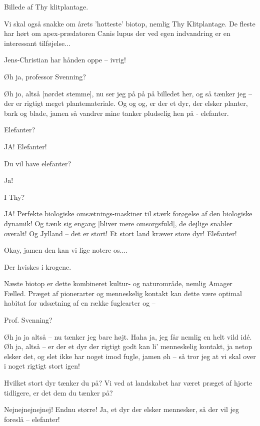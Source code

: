 \documentclass[a4paper,12pt]{article}
\begin{document}
\begin{sketch}
 Billede af Thy klitplantage.

 Vi skal også snakke om årets 'hotteste' biotop, nemlig Thy Klitplantage. De fleste har hørt om apex-prædatoren Canis lupus der ved egen indvandring er en interessant tilføjelse...

Jens-Christian har hånden oppe -- ivrig!

 Øh ja, professor Svenning?

 Øh jo, altså [nørdet stemme], nu ser jeg på på på billedet her, og så tænker jeg -- der er rigtigt meget plantemateriale. Og og og, er der et dyr, der elsker planter, bark og blade, jamen så vandrer mine tanker pludselig hen på - elefanter.

 Elefanter?

 JA! Elefanter! 

 Du vil have elefanter?

 Ja!

 I Thy?

 JA! Perfekte biologiske omsætnings-maskiner til stærk forøgelse af den biologiske dynamik! Og tænk sig engang [bliver mere omsorgsfuld], de dejlige snabler overalt! Og Jylland -- det er stort! Et stort land kræver store dyr! Elefanter!

 Okay, jamen den kan vi lige notere os.... 

Der hviskes i krogene.

 Næste biotop er dette kombineret kultur- og naturområde, nemlig Amager Fælled. Præget af pionerarter og menneskelig kontakt kan dette være optimal habitat for udsætning af en række fuglearter og --


 Prof. Svenning?

 Øh ja ja altså -- nu tænker jeg bare højt. Haha ja, jeg får nemlig en helt vild idé. Øh ja, altså -- er der et dyr der rigtigt godt kan li' menneskelig kontakt, ja netop elsker det, og slet ikke har noget imod fugle, jamen øh -- så tror jeg at vi skal over i noget rigtigt stort igen!

 Hvilket stort dyr tænker du på? Vi ved at landskabet har været præget af hjorte tidligere, er det dem du tænker på?

 Nejnejnejnejnej! Endnu større! Ja, et dyr der elsker mennesker, så der vil jeg foreslå -- elefanter! 


\end{sketch}
\end{document}
